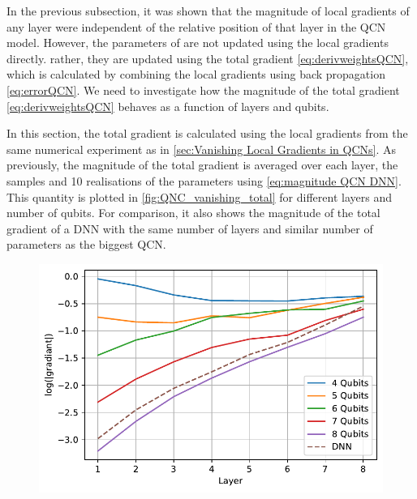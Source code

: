 
In the previous subsection, it was shown that the magnitude of local gradients of any layer were independent of the relative position of that layer in the QCN model. However, the parameters of are not updated using the local gradients directly. rather, they are updated using the total gradient \autoref{eq:derivweightsQCN}, which is calculated by combining the local gradients using back propagation \autoref{eq:errorQCN}. We need to investigate how the magnitude of the total gradient \autoref{eq:derivweightsQCN} behaves as a function of layers and qubits. 

In this section, the total gradient is calculated using the local gradients from the same numerical experiment as in \autoref{sec:Vanishing Local Gradients in QCNs}. As previously, the magnitude of the total gradient is averaged over each layer, the samples and 10 realisations of the parameters using \autoref{eq:magnitude QCN DNN}. This quantity is plotted in \autoref{fig:QNC_vanishing_total} for different layers and number of qubits. For comparison, it also shows the magnitude of the total gradient of a DNN with the same number of layers and similar number of parameters as the biggest QCN.

\begin{figure}[H]
    \centering
    \includegraphics[width=12cm]{latex/figures/vanishing_gradient_total.pdf}
    \caption{}
    \label{fig:QNC_vanishing_total}
\end{figure}

